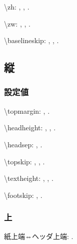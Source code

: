 \documentclass{FITpaper}
\begin{document}
\newlength{\myzh}
\setlength{\myzh}{1\zh}
\textbackslash zh:
\prntlen{\myzh},
\prntlen{\myzh},
\prntlen{\myzh}.

\newlength{\myzw}
\setlength{\myzw}{1\zw}
\textbackslash zw:
\prntlen{\myzw},
\prntlen{\myzw},
\prntlen{\myzw}.

\textbackslash baselineskip:
\prntlen{\baselineskip},
\prntlen{\baselineskip},
\prntlen{\baselineskip}.

\subsection{縦}

\subsubsection{設定値}

\textbackslash topmargin:
\prntlen{\topmargin},
\prntlen{\topmargin}.

\textbackslash headheight:
\prntlen{\headheight},
\prntlen{\headheight},
\prntlen{\headheight}.

\textbackslash headsep:
\prntlen{\headsep},
\prntlen{\headsep}.

\textbackslash topskip:
\prntlen{\topskip},
\prntlen{\topskip},
\prntlen{\topskip}.

\textbackslash textheight:
\prntlen{\textheight},
\prntlen{\textheight},
\prntlen{\textheight}.

\textbackslash footskip:
\prntlen{\footskip},
\prntlen{\footskip}.

\subsubsection{上}

\newlength{\mytop}
\setlength{\mytop}{\topmargin}

\addtolength{\mytop}{1in}

紙上端⇔ヘッダ上端:
\prntlen{\mytop}.

\addtolength{\mytop}{\headheight}
\end{document}
